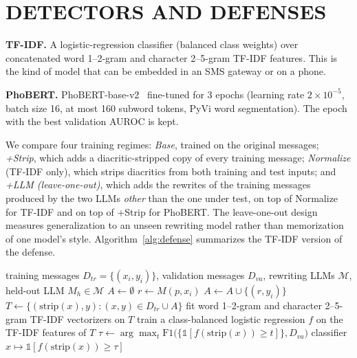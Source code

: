 \documentclass[11pt,a4paper]{article}
\begin{document}
\section{DETECTORS AND DEFENSES}\label{sec:det}
\textbf{TF-IDF.} A logistic-regression classifier (balanced class weights) over concatenated word 1--2-gram and character 2--5-gram TF-IDF features. This is the kind of model that can be embedded in an SMS gateway or on a phone.

\textbf{PhoBERT.} PhoBERT-base-v2~\cite{nguyen2020phobert} fine-tuned for 3 epochs (learning rate $2\times10^{-5}$, batch size 16, at most 160 subword tokens, PyVi word segmentation). The epoch with the best validation AUROC is kept.

We compare four training regimes:
\emph{Base}, trained on the original messages;
\emph{+Strip}, which adds a diacritic-stripped copy of every training message;
\emph{Normalize} (TF-IDF only), which strips diacritics from both training and test inputs;
and \emph{+LLM (leave-one-out)}, which adds the rewrites of the training messages produced by the two LLMs \emph{other} than the one under test, on top of Normalize for TF-IDF and on top of +Strip for PhoBERT. The leave-one-out design measures generalization to an unseen rewriting model rather than memorization of one model's style. Algorithm~\ref{alg:defense} summarizes the TF-IDF version of the defense.

\begin{algorithm}[t]
\caption{Training the +LLM (leave-one-out) TF-IDF filter for a held-out rewriting LLM $M_h$}
\label{alg:defense}
\begin{algorithmic}[1]
\Require training messages $D_{tr}=\{(x_i, y_i)\}$, validation messages $D_{va}$, rewriting LLMs $\mathcal{M}$, held-out LLM $M_h \in \mathcal{M}$
\State $A \gets \emptyset$
    \State $r \gets M(p, x_i)$ 
      \State $A \gets A \cup \{(r, y_i)\}$ 
    \EndIf
  \EndFor
\EndFor
\State $T \gets \{(\mathrm{strip}(x), y) : (x, y) \in D_{tr} \cup A\}$ 
\State fit word 1--2-gram and character 2--5-gram TF-IDF vectorizers on $T$
\State train a class-balanced logistic regression $f$ on the TF-IDF features of $T$
\State $\tau \gets \arg\max_t \mathrm{F1}\big(\{\mathbb{1}[f(\mathrm{strip}(x)) \ge t]\}, D_{va}\big)$ 
\State \Return classifier $x \mapsto \mathbb{1}[f(\mathrm{strip}(x)) \ge \tau]$
\end{algorithmic}
\end{algorithm}
\end{document}
